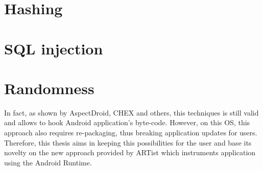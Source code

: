 \section{Hashing}

\section{SQL injection}

\section{Randomness}


In fact, as shown by AspectDroid\cite{AspectDroid}, CHEX\cite{chex} and others, this techniques is still valid and allows to hook Android application's byte-code. However, on this OS, this approach also requires re-packaging, thus breaking application updates for users. Therefore, this thesis aims in keeping this possibilities for the user and base its novelty on the new approach provided by ARTist\cite{artist} which instruments application using the Android Runtime.